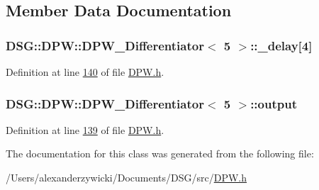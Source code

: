 \subsection{Member Data Documentation}
\hypertarget{class_d_s_g_1_1_d_p_w_1_1_d_p_w___differentiator_3_015_01_4_afc272a1eb4f3240b4148a64c7c9ccfc1}{
\subsubsection[{\+\_\+delay}]{ {\bf D\+S\+G\+::\+D\+P\+W\+::\+D\+P\+W\+\_\+\+Differentiator}$<$ 5 $>$\+::\+\_\+delay\mbox{[}4\mbox{]}\hspace{0.3cm}{\ttfamily [protected]}}}\label{class_d_s_g_1_1_d_p_w_1_1_d_p_w___differentiator_3_015_01_4_afc272a1eb4f3240b4148a64c7c9ccfc1}


Definition at line \hyperlink{_d_p_w_8h_source_l00140}{140} of file \hyperlink{_d_p_w_8h_source}{D\+P\+W.\+h}.

\hypertarget{class_d_s_g_1_1_d_p_w_1_1_d_p_w___differentiator_3_015_01_4_ae69bdfd7eb71c3c44691bda6067bda0c}{
\subsubsection[{output}]{ {\bf D\+S\+G\+::\+D\+P\+W\+::\+D\+P\+W\+\_\+\+Differentiator}$<$ 5 $>$\+::output\hspace{0.3cm}{\ttfamily [protected]}}}\label{class_d_s_g_1_1_d_p_w_1_1_d_p_w___differentiator_3_015_01_4_ae69bdfd7eb71c3c44691bda6067bda0c}


Definition at line \hyperlink{_d_p_w_8h_source_l00139}{139} of file \hyperlink{_d_p_w_8h_source}{D\+P\+W.\+h}.



The documentation for this class was generated from the following file\+:\begin{DoxyCompactItemize}
\item 
/\+Users/alexanderzywicki/\+Documents/\+D\+S\+G/src/\hyperlink{_d_p_w_8h}{D\+P\+W.\+h}\end{DoxyCompactItemize}
